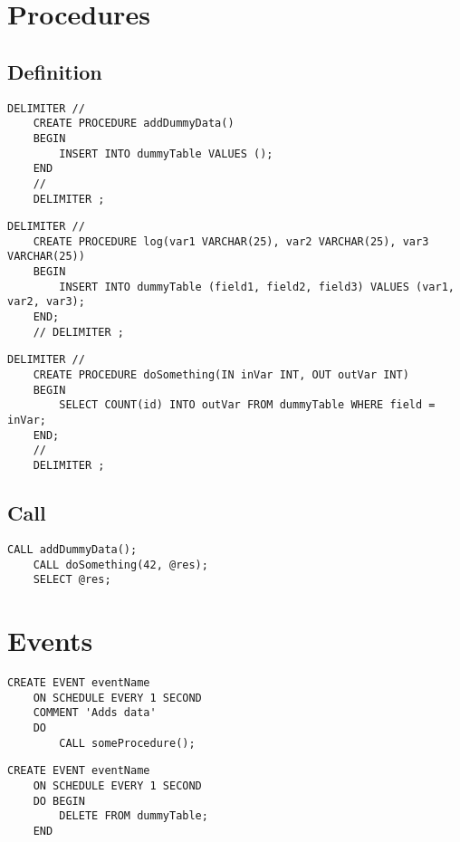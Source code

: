 \documentclass{article}
\begin{document}
\section{Procedures}

\subsection{Definition}

\begin{lstlisting}[style=sql]
    DELIMITER //
    CREATE PROCEDURE addDummyData()
    BEGIN
        INSERT INTO dummyTable VALUES ();
    END
    //
    DELIMITER ;
\end{lstlisting}

\begin{lstlisting}[style=sql]
    DELIMITER //
    CREATE PROCEDURE log(var1 VARCHAR(25), var2 VARCHAR(25), var3 VARCHAR(25))
    BEGIN
        INSERT INTO dummyTable (field1, field2, field3) VALUES (var1, var2, var3);
    END;
    // DELIMITER ;
\end{lstlisting}

\begin{lstlisting}[style=sql]
    DELIMITER //
    CREATE PROCEDURE doSomething(IN inVar INT, OUT outVar INT)
    BEGIN    
        SELECT COUNT(id) INTO outVar FROM dummyTable WHERE field = inVar;
    END;
    //
    DELIMITER ;
\end{lstlisting}

\subsection{Call}

\begin{lstlisting}[style=sql]
    CALL addDummyData();
    CALL doSomething(42, @res);
    SELECT @res;
\end{lstlisting}

\section{Events}

\begin{lstlisting}[style=sql]
    CREATE EVENT eventName
    ON SCHEDULE EVERY 1 SECOND
    COMMENT 'Adds data'
    DO
        CALL someProcedure();
\end{lstlisting}

\begin{lstlisting}[style=sql]
    CREATE EVENT eventName
    ON SCHEDULE EVERY 1 SECOND
    DO BEGIN
        DELETE FROM dummyTable;
    END
\end{lstlisting}
\end{document}
